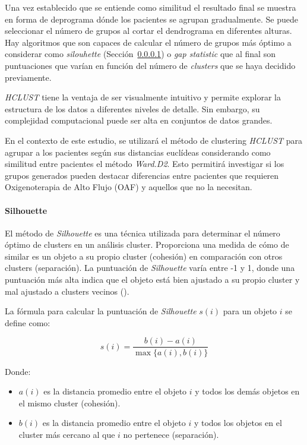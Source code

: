 Una vez establecido que se entiende como similitud el resultado final se muestra en forma de deprograma dónde los pacientes se agrupan gradualmente. Se puede seleccionar el número de grupos al cortar el dendrograma en diferentes alturas. Hay algoritmos que son capaces de calcular el número de grupos más óptimo a considerar como \textit{silouhette} (Sección~\ref{sec:silhouette}) o \textit{gap statistic} que al final son puntuaciones que varían en función del número de \textit{clusters} que se haya decidido previamente.

\textit{HCLUST} tiene la ventaja de ser visualmente intuitivo y permite explorar la estructura de los datos a diferentes niveles de detalle. Sin embargo, su complejidad computacional puede ser alta en conjuntos de datos grandes.

En el contexto de este estudio, se utilizará el método de clustering \textit{HCLUST} para agrupar a los pacientes según sus distancias euclídeas considerando como similitud entre pacientes el método \textit{Ward.D2}. Esto permitirá investigar si los grupos generados pueden destacar diferencias entre pacientes que requieren Oxigenoterapia de Alto Flujo (OAF) y aquellos que no la necesitan.

\paragraph{Silhouette}\label{sec:silhouette}

El método de \textit{Silhouette} es una técnica utilizada para determinar el número óptimo de clusters en un análisis cluster. Proporciona una medida de cómo de similar es un objeto a su propio cluster (cohesión) en comparación con otros clusters (separación). La puntuación de \textit{Silhouette} varía entre -1 y 1, donde una puntuación más alta indica que el objeto está bien ajustado a su propio cluster y mal ajustado a clusters vecinos (\cite{rousseeuw1987silhouettes}).

La fórmula para calcular la puntuación de \textit{Silhouette} \(s(i)\) para un objeto \(i\) se define como:

\[ s(i) = \frac{b(i) - a(i)}{\max\{a(i), b(i)\}} \]

Donde:
\begin{itemize}
    \item \(a(i)\) es la distancia promedio entre el objeto \(i\) y todos los demás objetos en el mismo cluster (cohesión).
    \item \(b(i)\) es la distancia promedio entre el objeto \(i\) y todos los objetos en el cluster más cercano al que \(i\) no pertenece (separación).
\end{itemize}

